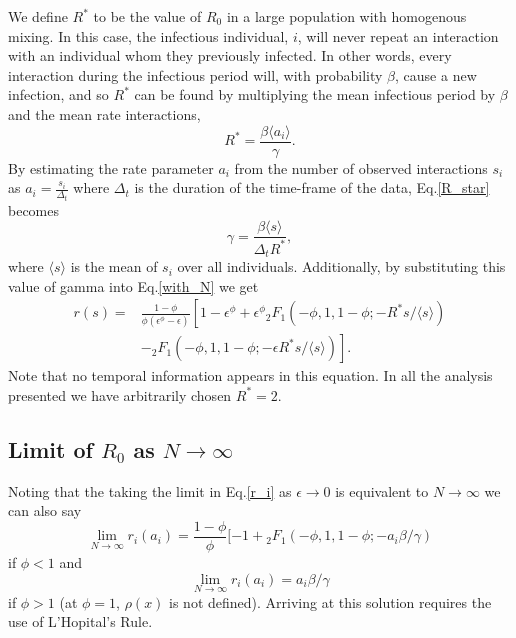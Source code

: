 \documentclass[10pt]{article}
\begin{document}
\begin{multicols}{2}
We define $R^{*}$ to be the value of $R_{0}$ in a large population with homogenous mixing. In this case, the infectious individual, $i$, will never repeat an interaction with an individual whom they previously infected. In other words, every interaction during the infectious period will, with probability $\beta$, cause a new infection, and so $R^{*}$ can be found by multiplying the mean infectious period by $\beta$ and the mean rate interactions,
\begin{equation}
\label{R_star}
R^{*}=\frac{\beta\langle a_{i}\rangle}{\gamma}.
\end{equation}
By estimating the rate parameter $a_{i}$ from the number of observed interactions $s_{i}$ as $a_{i}=\frac{s_{i}}{\Delta_t}$ where $\Delta_{t}$ is the duration of the time-frame of the data, Eq.\eqref{R_star} becomes
\begin{equation}
\label{gamma}
\gamma=\frac{\beta\langle s\rangle}{\Delta_{t} R^{*}},
\end{equation}
where $\langle s\rangle$ is the mean of $s_{i}$ over all individuals. Additionally, by substituting this value of gamma into Eq.\eqref{with_N} we get
\begin{equation}
\label{calibrated}
\begin{split}
r(s)=&\frac{1-\phi}{\phi(\epsilon^{\phi}-\epsilon)}\left[1-\epsilon^{\phi}+\epsilon^{\phi}{}_{2}F_{1}(-\phi,1,1-\phi;-R^{*}s/\langle s \rangle)\right.\\
&\left.-{}_{2}F_{1}(-\phi,1,1-\phi;-\epsilon R^{*}s/\langle s \rangle)\right].
\end{split}
\end{equation}
Note that no temporal information appears in this equation. In all the analysis presented we have arbitrarily chosen $R^{*}=2$. 

\subsection{Limit of $R_{0}$ as $N\rightarrow \infty$}
Noting that the taking the limit in Eq.\eqref{r_i} as $\epsilon\rightarrow 0$ is equivalent to  $N\rightarrow \infty$ we can also say
\begin{equation} 
\label{big_N}
\lim_{N\rightarrow\infty}r_{i}(a_{i}) =\frac{1-\phi}{\phi}[-1+{}_{2}F_{1}(-\phi,1,1-\phi;-a_{i}\beta/\gamma) 
\end{equation}
if $\phi<1$ and 
\begin{equation}
\label{big_N2}
\lim_{N\rightarrow\infty}r_{i}(a_{i}) =a_{i}\beta/\gamma 
\end{equation}
if $\phi>1$ (at $\phi=1$, $\rho(x)$ is not defined). Arriving at this solution requires the use of L'Hopital's Rule.


\end{multicols}
\end{document}

